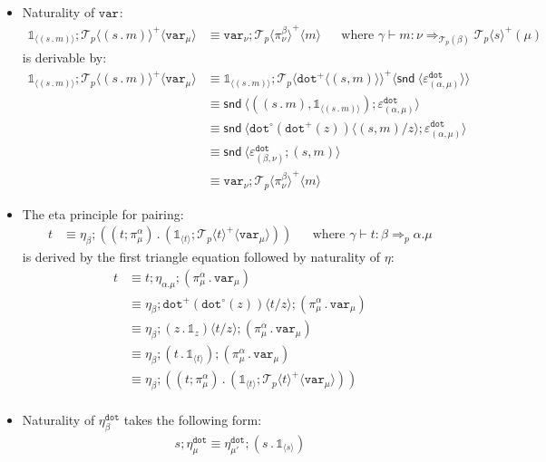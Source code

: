 \documentclass[10pt]{article}
\theoremstyle{definition}
\newcommand\dsd[1]{\ensuremath{\mathsf{#1}}}
\newcommand{\tcell}{\Rightarrow}
\newcommand{\app}[2]{\ensuremath{#1 \: #2}}
\newcommand{\snd}[1]{\app{\dsd{snd}}{#1}}
\newcommand\TermTwoT[5]{\ensuremath{#1 \vdash {#2} : #3 \tcell_{#5} #4}}
\newcommand\TrPlus[2]{\ensuremath{{#1}^+(#2)}}
\newcommand\TrCirc[2]{\ensuremath{{#1}^\circ(#2)}}
\newcommand\El[2]{\mathcal{T}_{#1}(#2)}
\newcommand\ApEl[2]{\mathcal{T}_{#1}\langle#2\rangle}
\newcommand\bdot[0]{\mathbin{.}}
\newcommand\ap[2]{\ensuremath{#1 \langle #2 \rangle }}
\newcommand\ApPlus[2]{\ensuremath{{#1}^+ \langle #2 \rangle }}
\newcommand{\tdot}{\ensuremath{\mathtt{dot}}}
\newcommand\One{\ensuremath{\mathds{1}}}
\newcommand\var[1]{\ensuremath{\mathtt{var}_{#1}}}
\newcommand\ApOne[1]{\ensuremath{\One_{\langle {#1} \rangle }}}
\begin{document}
\begin{itemize}
\item Naturality of $\var{}$:
\begin{align}
\label{beta-var}
\ApOne{(s \bdot m)};\ApPlus{\ApEl{p}{(s \bdot m)}}{\var{\mu}} &\equiv \var{\nu};\ApPlus{\ApEl{p}{\pi^\beta_\nu}}{m}  && \text{where } \TermTwoT{\gamma}{m}{\nu}{\TrPlus{\ApEl{p}{s}}{\mu}}{\El{p}{\beta}}
\end{align}
is derivable by:
\begin{align*}
\ApOne{(s \bdot m)};\ApPlus{\ApEl{p}{(s \bdot m)}}{\var{\mu}} 
&\equiv \ApOne{(s \bdot m)};\ApPlus{\ApEl{p}{\ApPlus{\tdot}{(s, m)}}}{\ap \snd {\varepsilon^\tdot_{(\alpha, \mu)}}} \\
&\equiv \ap \snd {((s \bdot m), \ApOne{(s \bdot m)});\varepsilon^\tdot_{(\alpha, \mu)}} \\
&\equiv \ap \snd {\ap{\TrCirc{\tdot}{\TrPlus{\tdot}{z}}}{(s, m)/z};\varepsilon^\tdot_{(\alpha, \mu)}} \\
&\equiv \ap \snd {\varepsilon^\tdot_{(\beta, \nu)};(s, m)} \\
&\equiv \var{\nu}; \ApPlus{\ApEl{p}{\pi^\beta_{\nu}}}{m} 
\end{align*}

\item The eta principle for pairing:
\begin{align}
\label{eta-pi-var}
t &\equiv \eta_\beta;((t;\pi_\mu^\alpha) \bdot (\ApOne{t}; \ApPlus{\ApEl{p}{t}}{\var{\mu}})) && \text{where } \TermTwoT{\gamma}{t}{\beta}{\alpha.\mu}{p}
\end{align}
is derived by the first triangle equation followed by naturality of $\eta$:
\begin{align*}
t &\equiv t;\eta_{\alpha.\mu};(\pi_\mu^\alpha \bdot \var{\mu}) \\
&\equiv \eta_\beta;\ap{\TrPlus{\tdot}{\TrCirc{\tdot}{z}}}{t/z};(\pi_\mu^\alpha \bdot \var{\mu}) \\
&\equiv \eta_\beta;\ap{(z \bdot \One_z)}{t/z};(\pi_\mu^\alpha \bdot \var{\mu}) \\
&\equiv \eta_\beta;(t \bdot \ApOne{t});(\pi_\mu^\alpha \bdot \var{\mu}) \\
&\equiv \eta_\beta;((t;\pi_\mu^\alpha) \bdot (\ApOne{t}; \ApPlus{\ApEl{p}{t}}{\var{\mu}})) \\
\end{align*}

\item Naturality of $\eta^\tdot_\beta$ takes the following form:
\begin{align*}
s;\eta^\tdot_\mu \equiv \eta^\tdot_{\mu'} ; (s \bdot \ApOne{s})
\end{align*}

\end{itemize}
\end{document}
